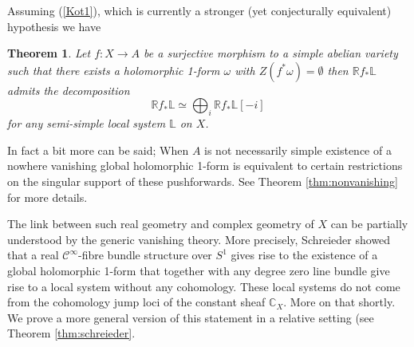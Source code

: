 \documentclass[12pt,reqno]{amsart}
\newtheorem{alphtheorem}{Theorem}
\theoremstyle{question}
\theoremstyle{definition}
\theoremstyle{remark}
\theoremstyle{cited}
\theoremstyle{citeddef}
\newcommand{\bbC}{\mathbb{C}}
\newcommand{\bbL}{\mathbb{L}}
\newcommand{\bbR}{\mathbb{R}}
\newcommand{\scrC}{\mathscr{C}}
\begin{document}
Assuming (\ref{Kot1}), which is currently a stronger (yet conjecturally
equivalent) hypothesis we have
\begin{alphtheorem}\label{thm:cxsmooth}
Let $f\colon X\to A$ be a surjective morphism to a simple abelian
variety such that there exists a holomorphic 1-form
$\omega$ with $Z(f^*\omega) = \emptyset$ then $\bbR f_*\bbL$
admits the decomposition
\[\bbR f_*\bbL \simeq \bigoplus_i \bbR f_*\bbL[-i]\]
for any semi-simple local system $\bbL$ on $X$. 
\end{alphtheorem}
In fact a bit more can be said; When $A$ is not necessarily simple existence of a nowhere vanishing global holomorphic 1-form
is equivalent to certain restrictions on the singular support of 
these pushforwards. See Theorem \ref{thm:nonvanishing} for more details. 

The link between such
 real geometry and complex geometry of $X$ can be partially
understood
by the generic vanishing theory. More precisely, Schreieder 
showed \cite[Theorem 1.2]{Sch19} that a real $\scrC^{\infty}$-fibre bundle structure over $S^1$ gives rise to the existence of 
a global
holomorphic 1-form that together with any degree zero line bundle give rise to a local system without any cohomology. These
local systems do not come from the cohomology jump loci of the constant sheaf $\bbC_X$. More on that shortly. We prove a more general
version of this statement in a relative setting (see Theorem
\ref{thm:schreieder}. 
\end{document}
